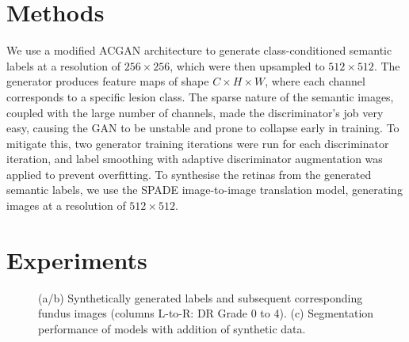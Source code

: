 \documentclass{midl} %
\begin{document}
\section{Methods}
We use a modified ACGAN architecture \cite{odena2017conditional} to generate class-conditioned semantic labels at a resolution of $256 \times 256$, which were then upsampled to $512 \times 512$.
The generator produces feature maps of shape $C \times H \times W$, where each channel corresponds to a specific lesion class.
The sparse nature of the semantic images, coupled with the large number of channels, made the discriminator's job very easy, causing the GAN to be unstable and prone to collapse early in training.
To mitigate this, two generator training iterations were run for each discriminator iteration, and label smoothing with adaptive discriminator augmentation \cite{karras2020training} was applied to prevent overfitting. To synthesise the retinas from the generated semantic labels, we use the SPADE \cite{spade} image-to-image translation model, generating images at a resolution of $512 \times 512$.

\section{Experiments}

\begin{figure}[ht]
\centering
{}\quad %
\quad %

\caption{(a/b) Synthetically generated labels and subsequent corresponding fundus images (columns L-to-R: DR Grade 0 to 4). (c) Segmentation performance of models with addition of synthetic data.}
\label{fig:gen}
\end{figure}
\end{document}
